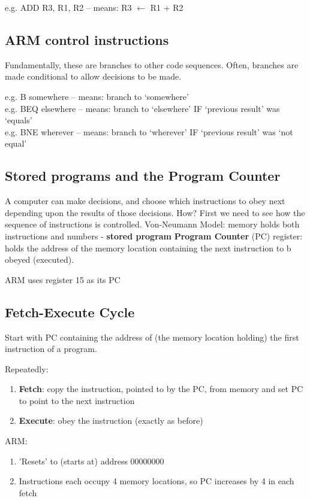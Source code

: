 \documentclass{article}
\begin{document}
e.g. ADD R3, R1, R2 – means: R3 \(\leftarrow\) R1 + R2

\subsection{ARM control instructions}
Fundamentally, these are branches to other code sequences. Often, branches are made conditional to allow decisions to be made.

e.g. B somewhere – means: branch to ‘somewhere’\\
e.g. BEQ elsewhere – means: branch to ‘elsewhere’ IF ‘previous result’ was ‘equals’\\
e.g. BNE wherever – means: branch to ‘wherever’ IF ‘previous result’ was ‘not equal’\\

\subsection{Stored programs and the Program Counter}
A computer can make decisions, and choose which instructions to obey next depending upon the results of those decisions. How? First we need to see how the sequence of instructions is controlled. Von-Neumann Model: memory holds both instructions and numbers - \textbf{stored program} \textbf{Program Counter} (PC) register: holds the address of the memory location containing the next instruction to b obeyed (executed).

ARM uses register 15 as its PC

\subsection{Fetch-Execute Cycle}
Start with PC containing the address of (the memory location holding) the first instruction of a program.

Repeatedly:
\begin{enumerate}
	\item \textbf{Fetch}: copy the instruction, pointed to by the PC, from memory and set PC to point to the next instruction
	\item \textbf{Execute}:  obey the instruction (exactly as before)
\end{enumerate}
ARM:
\begin{enumerate}
	\item 'Resets' to (starts at) address 00000000
	\item Instructions each occupy 4 memory locations, so PC increases by 4 in each fetch
\end{enumerate}
\end{document}
